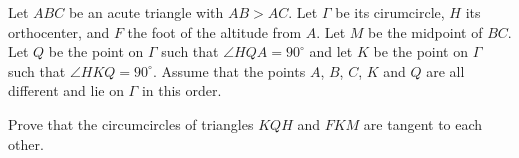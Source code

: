 Let 
$ABC$
 be an acute triangle with 
$AB > AC$.
 Let 
$\Gamma $
 be its cirumcircle, 
$H$
 its orthocenter, and 
$F$
 the foot of the altitude from 
$A$.
 Let 
$M$
 be the midpoint of 
$BC$.
 Let 
$Q$
 be the point on 
$\Gamma$
 such that 
$\angle HQA = 90^{\circ}$
 and let 
$K$
 be the point on 
$\Gamma$
 such that 
$\angle HKQ = 90^{\circ}$.
 Assume that the points 
$A$, 
$B$, 
$C$, 
$K$
 and 
$Q$
 are all different and lie on 
$\Gamma$
 in this order.


Prove that the circumcircles of triangles 
$KQH$
 and 
$FKM$
 are tangent to each other.

